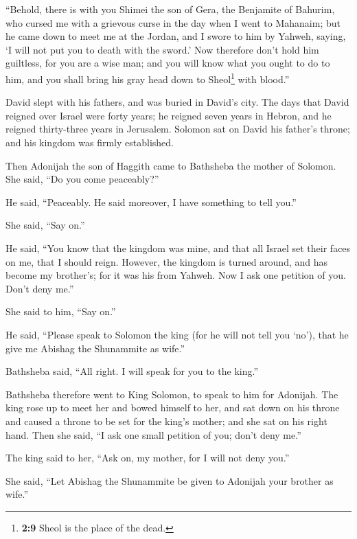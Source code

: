  ``Behold, there is with you Shimei the son of Gera, the
Benjamite of Bahurim, who cursed me with a grievous curse in the day
when I went to Mahanaim; but he came down to meet me at the Jordan, and
I swore to him by Yahweh, saying, `I will not put you to death with the
sword.'  Now therefore don't hold him guiltless, for you
are a wise man; and you will know what you ought to do to him, and you
shall bring his gray head down to Sheol\footnote{\textbf{2:9} Sheol is
  the place of the dead.} with blood.''

 David slept with his fathers, and was buried in David's
city.  The days that David reigned over Israel were forty
years; he reigned seven years in Hebron, and he reigned thirty-three
years in Jerusalem.  Solomon sat on David his father's
throne; and his kingdom was firmly established.

 Then Adonijah the son of Haggith came to Bathsheba the
mother of Solomon. She said, ``Do you come peaceably?''

He said, ``Peaceably.  He said moreover, I have something
to tell you.''

She said, ``Say on.''

 He said, ``You know that the kingdom was mine, and that
all Israel set their faces on me, that I should reign. However, the
kingdom is turned around, and has become my brother's; for it was his
from Yahweh.  Now I ask one petition of you. Don't deny
me.''

She said to him, ``Say on.''

 He said, ``Please speak to Solomon the king (for he will
not tell you `no'), that he give me Abishag the Shunammite as wife.''

 Bathsheba said, ``All right. I will speak for you to the
king.''

 Bathsheba therefore went to King Solomon, to speak to
him for Adonijah. The king rose up to meet her and bowed himself to her,
and sat down on his throne and caused a throne to be set for the king's
mother; and she sat on his right hand.  Then she said,
``I ask one small petition of you; don't deny me.''

The king said to her, ``Ask on, my mother, for I will not deny you.''

 She said, ``Let Abishag the Shunammite be given to
Adonijah your brother as wife.''


